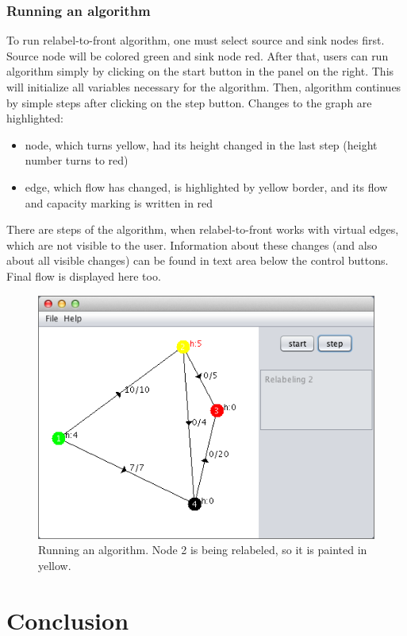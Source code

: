 \documentclass[a4paper,11pt]{article}
\begin{document}
\subsubsection*{Running an algorithm}
To run relabel-to-front algorithm, one must select source and sink nodes first. 
Source node will be colored green and sink node red. After that, users can run 
algorithm simply by clicking on the start button in the panel on the right. 
This will initialize all variables necessary for the algorithm. Then, algorithm 
continues by simple steps after clicking on the step button. Changes to the 
graph are highlighted:
\begin{itemize}
\item node, which turns yellow, had its height changed in the last step (height 
number turns to red)
\item edge, which flow has changed, is highlighted by yellow border, and its 
flow and capacity marking is written in red
\end{itemize}

There are steps of the algorithm, when relabel-to-front works with virtual edges,
which are not visible to the user. Information about these changes (and also 
about all visible changes) can be found in text area below the control buttons.
Final flow is displayed here too.

\begin{figure}[H]
\centering
\includegraphics[width=12cm]{2.png}
\caption{Running an algorithm. Node 2 is being relabeled, so it is painted in yellow.}
\label{pic1}
\end{figure}

\section{Conclusion}
\end{document}
